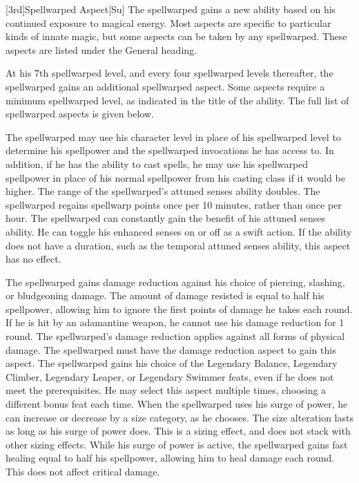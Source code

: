 [3rd]{Spellwarped Aspect}[Su]
The spellwarped gains a new ability based on his continued exposure to magical energy.
Most aspects are specific to particular kinds of innate magic, but some aspects can be taken by any spellwarped.
These aspects are listed under the General heading.

At his 7th spellwarped level, and every four spellwarped levels thereafter, the spellwarped gains an additional spellwarped aspect.
Some aspects require a minimum spellwarped level, as indicated in the title of the ability.
The full list of spellwarped aspects is given below.

The spellwarped may use his character level in place of his spellwarped level to determine his spellpower and the spellwarped invocations he has access to.
In addition, if he has the ability to cast spells, he may use his spellwarped spellpower in place of his normal spellpower from his casting class if it would be higher.
The range of the spellwarped's attuned senses ability doubles.
The spellwarped regains spellwarp points once per 10 minutes, rather than once per hour.
The spellwarped can constantly gain the benefit of his attuned senses ability.
He can toggle his enhanced senses on or off as a swift action.
If the ability does not have a duration, such as the temporal attuned senses ability, this aspect has no effect.

The spellwarped gains damage reduction against his choice of piercing, slashing, or bludgeoning damage.
The amount of damage resisted is equal to half his spellpower, allowing him to ignore the first points of damage he takes each round.
If he is hit by an adamantine weapon, he cannot use his damage reduction for 1 round.
The spellwarped's damage reduction applies against all forms of physical damage.
The spellwarped must have the damage reduction aspect to gain this aspect.
The spellwarped gains his choice of the Legendary Balance, Legendary Climber, Legendary Leaper, or Legendary Swimmer feats, even if he does not meet the prerequisites.
He may select this aspect multiple times, choosing a different bonus feat each time.
When the spellwarped uses his surge of power, he can increase or decrease by a size category, as he chooses.
The size alteration lasts as long as his surge of power does.
This is a sizing effect, and does not stack with other sizing effects.
While his surge of power is active, the spellwarped gains fast healing equal to half his spellpower, allowing him to heal damage each round.
This does not affect critical damage.

